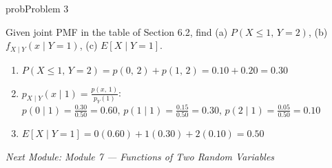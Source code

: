 \begin{PSbox}[unbreakable]{prob}{Problem 3}

Given joint PMF in the table of Section 6.2, find (a) $P(X \le 1,\, Y = 2)$, (b) $f_{X \mid Y}(x \mid Y = 1)$, (c) $E[X \mid Y = 1]$.

\PSsolution{} 

\begin{enumerate}
\def\labelenumi{(\alph{enumi})}
\tightlist
\item
  $P(X \le 1,\, Y = 2) = p(0,\,2) + p(1,\,2) = 0.10 + 0.20 = 0.30$
\item
  $p_{X \mid Y}(x \mid 1) = \frac{p(x,\,1)}{p_{Y}(1)}$: $p(0 \mid 1) = \frac{0.30}{0.50} = 0.60,\, p(1 \mid 1) = \frac{0.15}{0.50} = 0.30,\, p(2 \mid 1) = \frac{0.05}{0.50} = 0.10$
\item
  $E[X \mid Y = 1] = 0(0.60) + 1(0.30) + 2(0.10) = 0.50$
\end{enumerate}

\emph{Next Module: {Module 7 — Functions of Two Random Variables}}

\end{PSbox}
